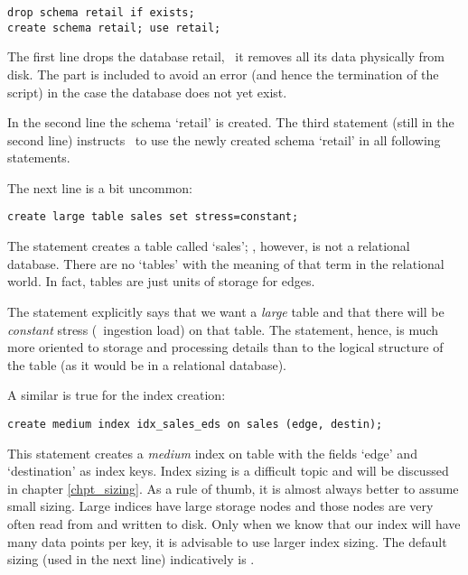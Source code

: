 \begin{sqlcode}
\begin{lstlisting}
drop schema retail if exists;
create schema retail; use retail;
\end{lstlisting}
\end{sqlcode}

The first line drops the database retail,
\ie\ it removes all its data physically
from disk. The  part
is included to avoid an error 
(and hence the termination of the script)
in the case
the database does not yet exist.

In the second line the schema `retail'
is created.
The third statement (still in the second line)
instructs \nowdb\ to use the newly created
schema `retail' in all following statements.

The next line is a bit uncommon:

\begin{sqlcode}
\begin{lstlisting}
create large table sales set stress=constant;
\end{lstlisting}
\end{sqlcode}

The statement creates a table called `sales';
\nowdb, however, is not a relational database.
There are no  
`tables' with the meaning of that term
in the relational world.
In fact, tables are just units of storage 
for edges. 

The statement explicitly says that we
want a \emph{large} table and that there
will be \emph{constant} stress (\ie\ ingestion load)
on that table. The  statement,
hence, is much more oriented to storage
and processing details than to the logical structure
of the table (as it would be in a relational database).

A similar is true for the index creation:

\begin{sqlcode}
\begin{lstlisting}
create medium index idx_sales_eds on sales (edge, destin);
\end{lstlisting}
\end{sqlcode}

This statement creates a \emph{medium} index on table 
with the fields `edge' and `destination' as index keys.
Index sizing is a difficult topic and will be discussed
in chapter \ref{chpt_sizing}.
As a rule of thumb, it is almost always better to assume
small sizing. Large indices have large storage nodes
and those nodes are very often read from and written
to disk. Only when we know that our index will have
many data points per key, it is advisable
to use larger index sizing. The default sizing (used in the next
line) indicatively is .

